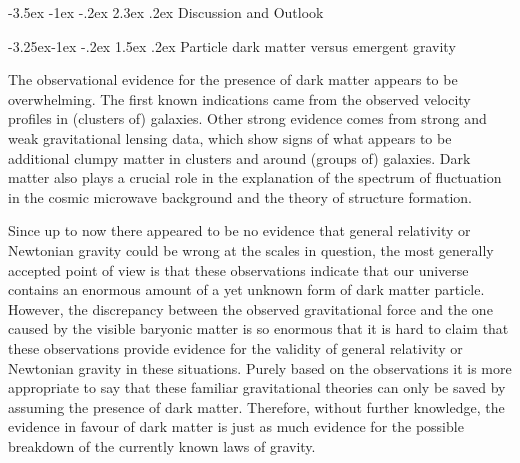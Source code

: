 \documentclass[a4paper,12pt]{article}
\makeatletter
\renewcommand\section{\@startsection {section}{1}{\z@}%
                                   {-3.5ex \@plus -1ex \@minus -.2ex}%
                                   {2.3ex \@plus.2ex}%
                                   {\normalfont\large\bfseries}}
\renewcommand\subsection{\@startsection{subsection}{2}{\z@}%
                                     {-3.25ex\@plus -1ex \@minus -.2ex}%
                                     {1.5ex \@plus .2ex}%
                                     {\normalfont\bfseries}}
\makeatother
\begin{document}




 



\vspace{1cm}


\section{Discussion and Outlook}
\setcounter{equation}{0}


\subsection{Particle dark matter versus emergent gravity}

The observational evidence for the presence of dark matter appears to be overwhelming. 
The first known indications came from the observed velocity profiles in (clusters of) galaxies.  Other strong evidence comes from strong and weak gravitational lensing data, which show signs of what appears to be additional clumpy matter in clusters and around (groups of) galaxies. Dark matter also 
plays a crucial role in the explanation of the spectrum of fluctuation in the cosmic microwave background and the theory of structure formation. 

Since up to now there appeared to be no evidence that general relativity or Newtonian gravity could be wrong at the scales in question, the most generally accepted point of view is that these observations 
indicate that our universe contains an enormous amount of a yet unknown form of dark matter particle. However, the discrepancy between the observed  
gravitational force and the one caused by the visible baryonic matter  is so enormous 
that it is hard to claim that these observations provide evidence for the validity of general relativity or Newtonian gravity in these situations. Purely based on the observations it is more appropriate to say that these familiar gravitational theories can only be saved by assuming the presence of dark matter. Therefore, without further knowledge, the evidence in favour of dark matter is just as much evidence for the possible breakdown of the currently known laws of gravity. 
\end{document}
